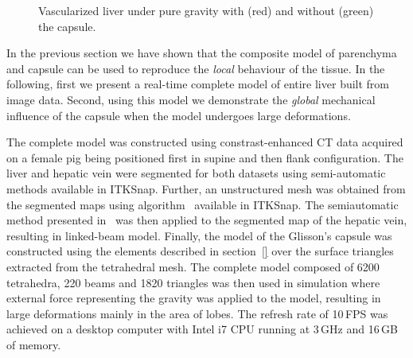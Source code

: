 \documentclass{llncs}
\begin{document}
\begin{figure}[htb]
  \centering
  \caption{\label{fig-gravity}Vascularized liver under pure gravity with (red) and without (green) the capsule.}
\end{figure}

In the previous section we have shown that the composite model of parenchyma and 
capsule can be used to reproduce the \emph{local} behaviour of the tissue. In the following, 
first we present a real-time complete model of entire liver built from image data. 
Second, using this model we demonstrate the \emph{global} mechanical influence of the capsule when 
the model undergoes large deformations. 

The complete model was constructed using constrast-enhanced CT data acquired on a female pig 
being positioned first in supine and then flank configuration. 
The liver and hepatic vein were segmented for both datasets  using semi-automatic methods available in ITKSnap.
Further, an unstructured mesh was obtained from the segmented maps using algorithm~\cite{boltcheva}
available in ITKSnap. The semiautomatic method presented in~\cite{peterlik2012} was 
then applied to the segmented map of the hepatic vein, resulting in linked-beam model. 
Finally, the model of the Glisson's capsule was constructed using the elements described in 
section~\ref{} over the surface triangles extracted from the tetrahedral mesh. 
The complete model composed of 6200 tetrahedra, 220 beams and 1820 triangles was then 
used in simulation where external force representing the gravity was applied to the model, 
resulting in large deformations mainly in the area of lobes. The refresh rate of 10\,FPS 
was achieved on a desktop computer with Intel i7 CPU running at 3\,GHz and 16\,GB of memory. 
\end{document}
